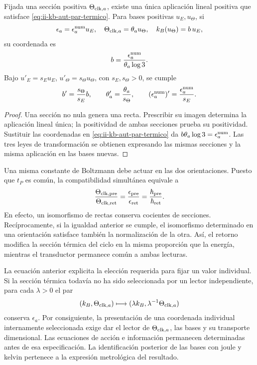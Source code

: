 \begin{samepage}
\begin{theorem}
Fijada una sección positiva \(\Theta_{{\rm clk},a}\), existe una
única aplicación lineal positiva que satisface
\eqref{eq:ii-kb-aut-par-termico}. Para bases positivas \(u_E,u_\Theta\),
si
\[
 \epsilon_a=\epsilon_a^{\rm num}u_E,\quad
 \Theta_{{\rm clk},a}=\theta_a u_\Theta,\quad
 k_B(u_\Theta)=b\,u_E,
\]
su coordenada es
\begin{equation}
 b=\frac{\epsilon_a^{\rm num}}{\theta_a\log3}.
 \label{eq:ii-kb-aut-coordenada}
\end{equation}
Bajo \(u'_E=s_Eu_E\), \(u'_\Theta=s_\Theta u_\Theta\), con
\(s_E,s_\Theta>0\), se cumple
\[
 b'=\frac{s_\Theta}{s_E}b,\qquad
 \theta'_a=\frac{\theta_a}{s_\Theta},\qquad
 (\epsilon_a^{\rm num})'=\frac{\epsilon_a^{\rm num}}{s_E}.
\]
\end{theorem}
\end{samepage}
\begin{proof}
Una sección no nula genera una recta. Prescribir su imagen determina
la aplicación lineal única; la positividad de ambas secciones prueba
su positividad. Sustituir las coordenadas en
\eqref{eq:ii-kb-aut-par-termico} da
\(b\theta_a\log3=\epsilon_a^{\rm num}\). Las tres leyes de
transformación se obtienen expresando las mismas secciones y la misma
aplicación en las bases nuevas.
\end{proof}

Una misma constante de Boltzmann debe actuar en las dos orientaciones.
Puesto que \(t_P\) es común, la compatibilidad simultánea equivale a
\begin{equation}
 \frac{\Theta_{{\rm clk},{\rm pre}}}{\Theta_{{\rm clk},{\rm ret}}}
 =\frac{\epsilon_{\rm pre}}{\epsilon_{\rm ret}}
 =\frac{\hbar_{\rm pre}}{\hbar_{\rm ret}}.
 \label{eq:ii-kb-aut-orientaciones}
\end{equation}
En efecto, un isomorfismo de rectas conserva cocientes de secciones.
Recíprocamente, si la igualdad anterior se cumple, el isomorfismo
determinado en una orientación satisface también la normalización de
la otra. Así, el retorno modifica la sección térmica del ciclo en la
misma proporción que la energía, mientras el transductor permanece
común a ambas lecturas.

La ecuación anterior explicita la elección requerida para fijar un
valor individual. Si la sección térmica todavía no ha sido seleccionada
por un lector independiente, para cada \(\lambda>0\) el par
\[
 (k_B,\Theta_{{\rm clk},a})
 \longmapsto(\lambda k_B,\lambda^{-1}\Theta_{{\rm clk},a})
\]
conserva \(\epsilon_a\). Por consiguiente, la presentación de una
coordenada individual internamente seleccionada exige dar el lector de
\(\Theta_{{\rm clk},a}\), las bases y su transporte dimensional.
Las ecuaciones de acción e información permanecen determinadas antes
de esa especificación. La identificación posterior de las bases con
joule y kelvin pertenece a la expresión metrológica del resultado.

